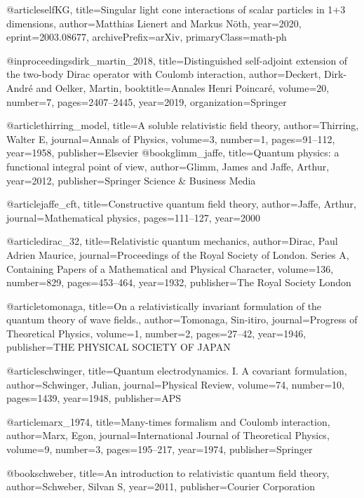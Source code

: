@article{selfKG,
    title={Singular light cone interactions of scalar particles in 1+3 dimensions},
    author={Matthias Lienert and Markus N{\"o}th},
    year={2020},
    eprint={2003.08677},
    archivePrefix={arXiv},
    primaryClass={math-ph}
}

@inproceedings{dirk_martin_2018,
  title={Distinguished self-adjoint extension of the two-body Dirac operator with Coulomb interaction},
  author={Deckert, Dirk-Andr{\'e} and Oelker, Martin},
  booktitle={Annales Henri Poincar{\'e}},
  volume={20},
  number={7},
  pages={2407--2445},
  year={2019},
  organization={Springer}
}

@article{thirring_model,
  title={A soluble relativistic field theory},
  author={Thirring, Walter E},
  journal={Annals of Physics},
  volume={3},
  number={1},
  pages={91--112},
  year={1958},
  publisher={Elsevier}
}
@book{glimm_jaffe,
  title={Quantum physics: a functional integral point of view},
  author={Glimm, James and Jaffe, Arthur},
  year={2012},
  publisher={Springer Science \& Business Media}
}

@article{jaffe_cft,
  title={Constructive quantum field theory},
  author={Jaffe, Arthur},
  journal={Mathematical physics},
  pages={111--127},
  year={2000}
}


@article{dirac_32,
  title={Relativistic quantum mechanics},
  author={Dirac, Paul Adrien Maurice},
  journal={Proceedings of the Royal Society of London. Series A, Containing Papers of a Mathematical and Physical Character},
  volume={136},
  number={829},
  pages={453--464},
  year={1932},
  publisher={The Royal Society London}
}

@article{tomonaga,
  title={On a relativistically invariant formulation of the quantum theory of wave fields.},
  author={Tomonaga, Sin-itiro},
  journal={Progress of Theoretical Physics},
  volume={1},
  number={2},
  pages={27--42},
  year={1946},
  publisher={THE PHYSICAL SOCIETY OF JAPAN}
}

@article{schwinger,
  title={Quantum electrodynamics. I. A covariant formulation},
  author={Schwinger, Julian},
  journal={Physical Review},
  volume={74},
  number={10},
  pages={1439},
  year={1948},
  publisher={APS}
}

@article{marx_1974,
  title={Many-times formalism and Coulomb interaction},
  author={Marx, Egon},
  journal={International Journal of Theoretical Physics},
  volume={9},
  number={3},
  pages={195--217},
  year={1974},
  publisher={Springer}
}

@book{schweber,
  title={An introduction to relativistic quantum field theory},
  author={Schweber, Silvan S},
  year={2011},
  publisher={Courier Corporation}
}

